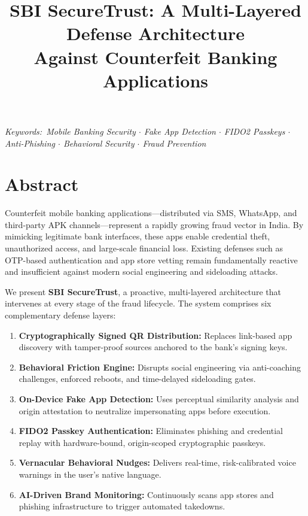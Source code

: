 \documentclass[10pt]{article}
\begin{document}
\title{\textbf{SBI SecureTrust: A Multi-Layered Defense Architecture\\Against Counterfeit Banking Applications}}
\date{}
\maketitle

\begin{center}
\textit{\small Keywords:\ Mobile Banking Security $\cdot$ Fake App Detection $\cdot$ FIDO2 Passkeys $\cdot$ Anti-Phishing $\cdot$ Behavioral Security $\cdot$ Fraud Prevention}
\end{center}

\vspace{0.4cm}

\section*{Abstract}

\noindent
Counterfeit mobile banking applications---distributed via SMS, WhatsApp, and third-party APK channels---represent a rapidly growing fraud vector in India. By mimicking legitimate bank interfaces, these apps enable credential theft, unauthorized access, and large-scale financial loss. Existing defenses such as OTP-based authentication and app store vetting remain fundamentally reactive and insufficient against modern social engineering and sideloading attacks.

We present \textbf{SBI SecureTrust}, a proactive, multi-layered architecture that intervenes at every stage of the fraud lifecycle. The system comprises six complementary defense layers:

\begin{enumerate}[leftmargin=*, itemsep=1pt, parsep=0pt, topsep=4pt]
    \item \textbf{Cryptographically Signed QR Distribution:} Replaces link-based app discovery with tamper-proof sources anchored to the bank's signing keys.
    \item \textbf{Behavioral Friction Engine:} Disrupts social engineering via anti-coaching challenges, enforced reboots, and time-delayed sideloading gates.
    \item \textbf{On-Device Fake App Detection:} Uses perceptual similarity analysis and origin attestation to neutralize impersonating apps before execution.
    \item \textbf{FIDO2 Passkey Authentication:} Eliminates phishing and credential replay with hardware-bound, origin-scoped cryptographic passkeys.
    \item \textbf{Vernacular Behavioral Nudges:} Delivers real-time, risk-calibrated voice warnings in the user's native language.
    \item \textbf{AI-Driven Brand Monitoring:} Continuously scans app stores and phishing infrastructure to trigger automated takedowns.
\end{enumerate}
\end{document}
